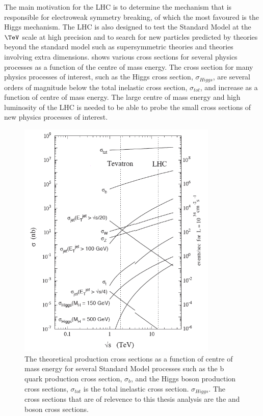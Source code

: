 The main motivation for the LHC is to determine the mechanism that is
responsible for electroweak symmetry breaking, of which the most favoured is the
Higgs mechanism.  The LHC is also designed to test the Standard Model at the
$\TeV$ scale at high precision and to search for new particles predicted by
theories beyond the standard model such as supersymmetric theories and theories
involving extra dimensions.   shows various cross
sections for several physics processes as a function of the centre of mass
energy. The cross section for many physics processes of interest, such as the
Higgs cross section, $\sigma_{Higgs}$, are several orders of magnitude below the total inelastic
cross section, $\sigma_{tot}$, and increase as a function of centre of mass energy.  The large
centre of mass energy and high luminosity of the LHC is needed to be able to
probe the small cross sections of new physics processes of interest.

\begin{figure}[htbp]
  \centering
  \includegraphics[width=0.85\textwidth]{xsec.png}
  \caption{The theoretical production cross sections as a function of centre of mass energy
for several Standard Model processes such as the b quark production cross
section, $\sigma_{b}$, and the Higgs boson production cross sections,
$\sigma_{tot}$ is the total inelastic cross section.
$\sigma_{Higgs}$. The cross sections that are of relevence to this thesis
analysis are the \PW and \PZ boson cross sections.
}
  \label{fig:LHCxsec}
\end{figure}

